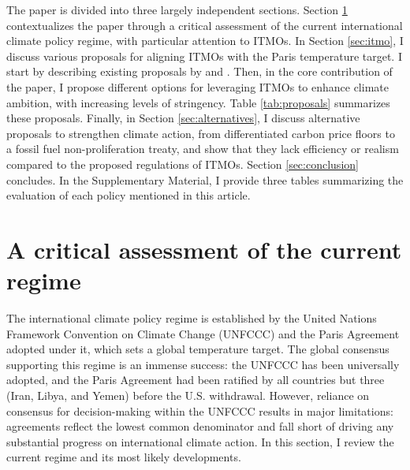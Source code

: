 \documentclass[12pt,english]{article}
\begin{document}
The paper is divided into three largely independent sections. 
Section \ref{sec:criticism} contextualizes the paper through a critical assessment of the current international climate policy regime, with particular attention to ITMOs. 
In Section \ref{sec:itmo}, I discuss various proposals for aligning ITMOs with the Paris temperature target. I start by describing existing proposals by \cite{michaelowa_additionality_2019} and \cite{la_hoz_theuer_when_2019}. %
Then, in the core contribution of the paper, I propose different options for leveraging ITMOs to enhance climate ambition, with increasing levels of stringency. Table \ref{tab:proposals} summarizes these proposals. %
Finally, in Section \ref{sec:alternatives}, I discuss alternative proposals to strengthen climate action, from differentiated carbon price floors to a fossil fuel non-proliferation treaty, and show that they lack efficiency or realism compared to the proposed regulations of ITMOs. Section \ref{sec:conclusion} concludes. In the Supplementary Material, I provide three tables summarizing the evaluation of each policy mentioned in this article. 

\section{A critical assessment of the current regime\label{sec:now}}\label{sec:criticism}%

The international climate policy regime is established by the United Nations Framework Convention on Climate Change (UNFCCC) and %
the Paris Agreement adopted under it, which sets a global temperature target. The global consensus supporting this regime is an immense success: the UNFCCC has been universally adopted, and the Paris Agreement had been ratified by all countries but three (Iran, Libya, and Yemen) before the U.S. withdrawal. However, reliance on consensus for decision-making within the UNFCCC results in major limitations: agreements reflect the lowest common denominator and fall short of driving any substantial progress on international climate action. In this section, I review the current regime and its most likely developments.
\end{document}
